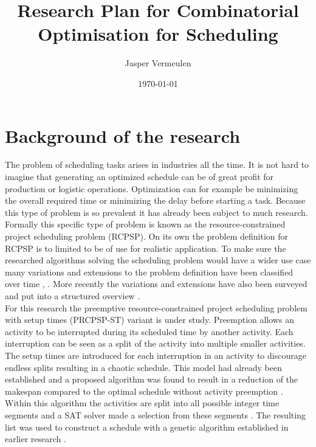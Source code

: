 \documentclass[english]{article}
\title{Research Plan for Combinatorial Optimisation for Scheduling}
\author{Jasper Vermeulen}
\date{\today}
\begin{document}
\maketitle

\section*{Background of the research}
The problem of scheduling tasks arises in industries all the time. It is not hard to imagine that generating an optimized schedule can be of great profit for production or logistic operations. Optimization can for example be minimizing the overall required time or minimizing the delay before starting a task. Because this type of problem is so prevalent it has already been subject to much research.\\
Formally this specific type of problem is known as the resource-constrained project scheduling problem (RCPSP). On its own the problem definition for RCPSP is to limited to be of use for realistic application. To make sure the researched algorithms solving the scheduling problem would have a wider use case many variations and extensions to the problem definition have been classified over time \cite{RN9}, \cite{RN10}. More recently the variations and extensions have also been surveyed and put into a structured overview \cite{RN6}.\\
For this research the preemptive resource-constrained project scheduling problem with setup times (PRCPSP-ST) variant is under study. Preemption allows an activity to be interrupted during its scheduled time by another activity. Each interruption can be seen as a split of the activity into multiple smaller activities. The setup times are introduced for each interruption in an activity to discourage endless splits resulting in a chaotic schedule. This model had already been established \cite{RN13} and a proposed algorithm was found to result in a reduction of the makespan compared to the optimal schedule without activity preemption \cite{RN1}. Within this algorithm the activities are split into all possible integer time segments and a SAT solver made a selection from these segments \cite{RN3}. The resulting list was used to construct a schedule with a genetic algorithm established in earlier research \cite{RN14}.\\
\end{document}
